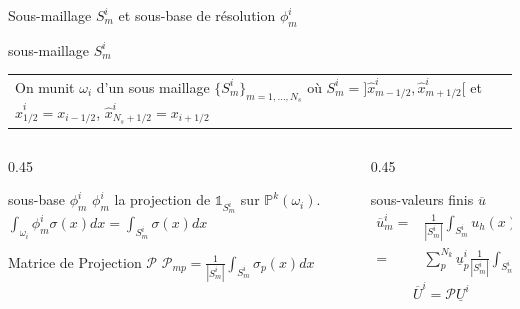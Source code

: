 

\begin{frame}{Sous-maillage $S_m^i$ et sous-base de résolution $\phi_m^i$}

\begin{block}{sous-maillage $S_m^i$}
\begin{tabular}{p{6cm}c}
On munit $\omega_i$ d'un sous maillage $\{S_m^i\}_{m=1,\dots,N_s}$ où $S_m^i = ]\hat{x}_{m-1/2}^i,\hat{x}_{m+1/2}^i[$ 
et $\hat{x}^i_{1/2} = x_{i-1/2}$, $\hat{x}^i_{N_s+1/2} = x_{i+1/2}$ 
&
\raisebox{-10mm}{\usebox{\smaillage}}
\end{tabular}   
\end{block}

\begin{columns}

\begin{column}{0.45\textwidth}
\begin{block}{sous-base $\phi_m^i$}
$\phi_m^i$ la projection de $\mathbb{1}_{S_m^i}$ sur $\mathbb{P}^k(\omega_i)$.
$\int_{\omega_i} \phi_m^i \sigma(x)dx = \int_{S_m^i} \sigma(x)dx$
\end{block}

\begin{block}{Matrice de Projection $\mathcal{P}$}
$\mathcal{P}_{mp} = \frac{1}{|S_m^i|}\int_{S_m^i} \sigma_p(x)dx$
\end{block}

\end{column}

\begin{column}{0.45\textwidth}
\begin{block}{sous-valeurs finis $\overline{u}$}
\begin{equation}
    \begin{aligned}
    \overline{u}_m^i =&\frac{1}{|S_m^i|} \int_{S_m^i}u_h(x)dx  \\
    =&\sum_{p}^{N_k} \underline{u}^i_p \frac{1}{|S_m^i|} \int_{S_m^i} \sigma_p(x)dx
    \end{aligned}
\end{equation}
\begin{equation}
    \overline{U}^i = \mathcal{P}\underline{U}^i
\end{equation}
\end{block}
\end{column}

\end{columns}

\end{frame}


